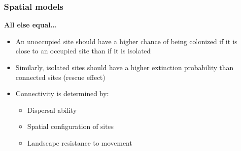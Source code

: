 \documentclass[color=usenames,dvipsnames]{beamer}\usepackage[]{graphicx}\usepackage[]{color}
\begin{document}
\begin{frame}
  \frametitle{Spatial models}
  \large
  {\bf All else equal\dots}
  \begin{itemize}%
    \item An unoccupied site should have a higher chance of being
      colonized if it is close to an occupied site than if it is isolated
    \item<2-> Similarly, isolated sites should have a higher extinction
      probability than connected sites (rescue effect)
    \item<3-> Connectivity is determined by:
      \begin{itemize}
        \large
        \item<4-> Dispersal ability
        \item<4-> Spatial configuration of sites
        \item<4-> Landscape resistance to movement
      \end{itemize}
  \end{itemize}
\end{frame}



\end{document}
